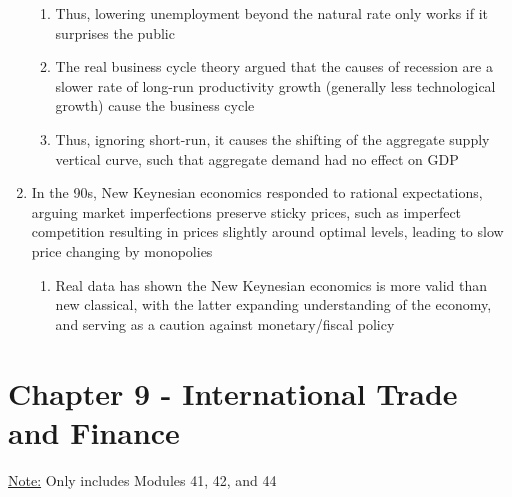 \documentclass[11 pt, twoside]{article}
\begin{document}
\begin{enumerate}
\begin{enumerate}
\item Thus, lowering unemployment beyond the natural rate only works if it surprises the public
\item The real business cycle theory argued that the causes of recession are a slower rate of long-run productivity growth (generally less technological growth) cause the business cycle
\item Thus, ignoring short-run, it causes the shifting of the aggregate supply vertical curve, such that aggregate demand had no effect on GDP
\end{enumerate}
\item In the 90s, New Keynesian economics responded to rational expectations, arguing market imperfections preserve sticky prices, such as imperfect competition resulting in prices slightly around optimal levels, leading to slow price changing by monopolies
\begin{enumerate}
\item Real data has shown the New Keynesian economics is more valid than new classical, with the latter expanding understanding of the economy, and serving as a caution against monetary/fiscal policy
\end{enumerate}
\end{enumerate}

\section{Chapter 9 - International Trade and Finance}
\underline{Note:} Only includes Modules 41, 42, and 44
\end{document}

